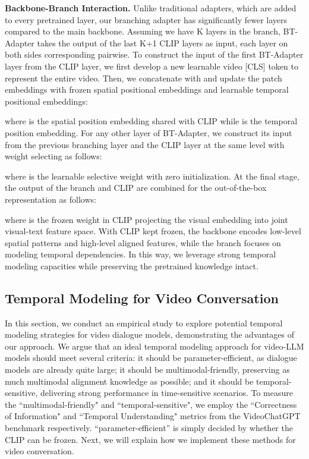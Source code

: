 \documentclass{article} \usepackage{iclr2024_conference,times}
\begin{document}
\noindent \textbf{Backbone-Branch Interaction.} 
Unlike traditional adapters, which are added to every pretrained layer, our branching adapter has significantly fewer layers compared to the main backbone. Assuming we have K layers in the branch, BT-Adapter takes the output of the last K+1 CLIP layers as input, each layer on both sides corresponding pairwise. To construct the input of the first BT-Adapter layer from the  CLIP layer, we first develop a new learnable video [CLS] token  to represent the entire video. Then, we concatenate  with  and update the patch embeddings with frozen spatial positional embeddings and learnable temporal positional embeddings:

where  is the spatial position embedding shared with CLIP while  is the temporal position embedding. For any other layer of BT-Adapter, we construct its input  from the previous branching layer and the CLIP layer at the same level with weight selecting as follows: 

where  is the learnable selective weight with zero initialization. At the final stage, the output of the branch and CLIP are combined for the out-of-the-box representation as follows:

where  is the frozen weight in CLIP projecting the visual embedding into joint visual-text feature space. With CLIP kept frozen, the backbone encodes low-level spatial patterns and high-level aligned features, while the branch focuses on modeling temporal dependencies. In this way, we leverage strong temporal modeling capacities while preserving the pretrained knowledge intact.

\subsection{Temporal Modeling for Video Conversation} \label{method_temp}
In this section, we conduct an empirical study to explore potential temporal modeling strategies for video dialogue models, demonstrating the advantages of our approach. We argue that an ideal temporal modeling approach for video-LLM models should meet several criteria: it should be parameter-efficient, as dialogue models are already quite large; it should be multimodal-friendly, preserving as much multimodal alignment knowledge as possible; and it should be temporal-sensitive, delivering strong performance in time-sensitive scenarios. To measure the ``multimodal-friendly" and ``temporal-sensitive", we employ the ``Correctness of Information" and ``Temporal Understanding" metrics from the VideoChatGPT benchmark \citep{maaz2023video} respectively. ``parameter-efficient'' is simply decided by whether the CLIP can be frozen. Next, we will explain how we implement these methods for video conversation.
\end{document}
